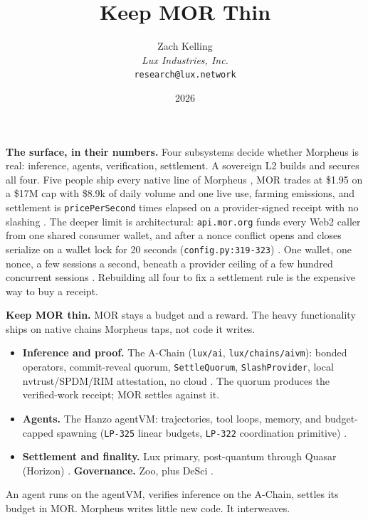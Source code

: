 \documentclass[11pt,a4paper]{article}
\title{Keep MOR Thin}
\author{Zach Kelling\\\textit{Lux Industries, Inc.}\\\texttt{research@lux.network}}
\date{2026}
\newcommand{\code}[1]{\texttt{\small #1}}
\newcommand{\prov}[1]{{\color{muted}\scriptsize\sffamily[#1]}}
\begin{document}
\luxcoverpage
\sloppy

\par
\vspace{0.8ex}
\par
\vspace{0.7ex}
\noindent{\color{rule}\rule{\linewidth}{1.1pt}}\par
\vspace{1.0ex}
\par
\vspace{0.9ex}

\noindent\textbf{The surface, in their numbers.}
Four subsystems decide whether Morpheus is real: inference, agents, verification, settlement. A
sovereign L2 builds and secures all four. Five people ship every native line of Morpheus \prov{verified},
MOR trades at \$1.95 on a \$17M cap with \$8.9k of daily volume and one live use, farming emissions, and
settlement is \code{pricePerSecond} times elapsed on a provider-signed receipt with no slashing
\prov{verified}. The deeper limit is
architectural: \code{api.mor.org} funds every Web2 caller from one shared consumer wallet, and after a
nonce conflict opens and closes serialize on a wallet lock for 20 seconds
(\code{config.py:319-323}) \prov{verified}. One wallet, one nonce, a few sessions a second, beneath a
provider ceiling of a few hundred concurrent sessions \prov{verified}. Rebuilding all four to fix a
settlement rule is the expensive way to buy a receipt.

\vspace{0.35ex}
\noindent\textbf{Keep MOR thin.}
MOR stays a budget and a reward. The heavy functionality ships on native chains Morpheus taps, not code it
writes.
\begin{itemize}
\item \textbf{Inference and proof.} The A-Chain (\code{lux/ai}, \code{lux/chains/aivm}): bonded operators,
      commit-reveal quorum, \code{SettleQuorum}, \code{SlashProvider}, local nvtrust/SPDM/RIM attestation,
      no cloud \prov{verified}. The quorum produces the verified-work receipt; MOR settles against it.
\item \textbf{Agents.} The Hanzo agentVM: trajectories, tool loops, memory, and budget-capped spawning
      (\code{LP-325} linear budgets, \code{LP-322} coordination primitive) \prov{verified}.
\item \textbf{Settlement and finality.} Lux primary, post-quantum through Quasar (Horizon) \prov{verified}.
      \textbf{Governance.} Zoo, plus DeSci \prov{verified}.
\end{itemize}
An agent runs on the agentVM, verifies inference on the A-Chain, settles its budget in MOR. Morpheus
writes little new code. It interweaves.
\end{document}
